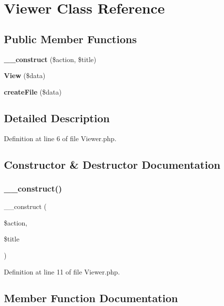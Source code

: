 \section{Viewer Class Reference}
\label{class_app_1_1_viewer}
\subsection*{Public Member Functions}
\begin{DoxyCompactItemize}
\item 
\textbf{ \+\_\+\+\_\+construct} (\$action, \$title)
\item 
\textbf{ View} (\$data)
\item 
\textbf{ create\+File} (\$data)
\end{DoxyCompactItemize}


\subsection{Detailed Description}


Definition at line 6 of file Viewer.\+php.



\subsection{Constructor \& Destructor Documentation}
\mbox{\label{class_app_1_1_viewer_a5dc57f09efa63fa174e82e8f34a79c3b}} 
\subsubsection{\+\_\+\+\_\+construct()}
{\footnotesize\ttfamily \+\_\+\+\_\+construct (\begin{DoxyParamCaption}\item[{}]{\$action,  }\item[{}]{\$title }\end{DoxyParamCaption})}



Definition at line 11 of file Viewer.\+php.



\subsection{Member Function Documentation}
\mbox{\label{class_app_1_1_viewer_a6826cb34504c5216f4352fec9f9f27d2}} 
